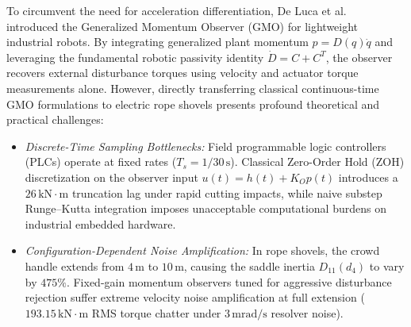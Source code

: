 \documentclass[journal]{IEEEtran}
\begin{document}
To circumvent the need for acceleration differentiation, De Luca et al.~\cite{deluca2003, deluca2006} introduced the Generalized Momentum Observer (GMO) for lightweight industrial robots. By integrating generalized plant momentum $p = D(q)\dot{q}$ and leveraging the fundamental robotic passivity identity $\dot{D} = C + C^T$, the observer recovers external disturbance torques using velocity and actuator torque measurements alone. However, directly transferring classical continuous-time GMO formulations to electric rope shovels presents profound theoretical and practical challenges:
\begin{itemize}
    \item \emph{Discrete-Time Sampling Bottlenecks:} Field programmable logic controllers (PLCs) operate at fixed rates ($T_s = 1/30\,\mathrm{s}$). Classical Zero-Order Hold (ZOH) discretization on the observer input $u(t) = h(t) + K_O p(t)$ introduces a $26\,\mathrm{kN\cdot m}$ truncation lag under rapid cutting impacts, while naive substep Runge--Kutta integration imposes unacceptable computational burdens on industrial embedded hardware.
    \item \emph{Configuration-Dependent Noise Amplification:} In rope shovels, the crowd handle extends from $4\,\mathrm{m}$ to $10\,\mathrm{m}$, causing the saddle inertia $D_{11}(d_4)$ to vary by $475\%$. Fixed-gain momentum observers tuned for aggressive disturbance rejection suffer extreme velocity noise amplification at full extension ($193.15\,\mathrm{kN\cdot m}$ RMS torque chatter under $3\,\mathrm{mrad/s}$ resolver noise).
\end{itemize}
\end{document}
